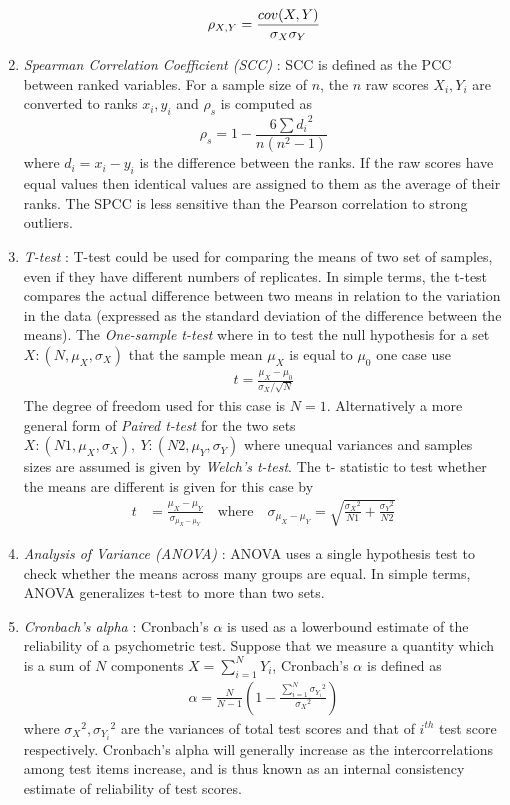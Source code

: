 \begin{enumerate}
\begin{equation}
\rho_{X,Y} = \frac{cov(X,Y)}{\sigma_X\sigma_Y} \\
\end{equation}
\item \emph{Spearman Correlation Coefficient (SCC)} : SCC is defined as the PCC between ranked variables. For a sample size of $n$, the $n$ raw scores $X_i,Y_i$ are converted to ranks $x_i,y_i$ and $\rho_s$ is computed as
\begin{equation}
\rho_s = 1-\frac{6\sum {d_i}^2}{n(n^2-1)} 
\end{equation}
where $d_i=x_i-y_i$ is the difference between the ranks. If the raw scores have equal values then identical values are assigned to them as the average of their ranks. The SPCC is less sensitive than the Pearson correlation to strong outliers. 
\item \emph{T-test} : T-test could be used for comparing the means of two set of samples, even if they have different numbers of replicates. In simple terms, the t-test compares the actual difference between two means in relation to the variation in the data (expressed as the standard deviation of the difference between the means). The \emph{One-sample t-test} where in to test the null hypothesis for a set $X:(N,\mu_X,\sigma_X)$ that the sample mean $\mu_X$ is equal to $\mu_0$ one case use
\begin{align*}
t = \frac{\mu_X - \mu_0}{\sigma_X/\sqrt{N}}
\end{align*}
The degree of freedom used for this case is $N=1$. Alternatively a more general form of \emph{Paired t-test} for the two sets $X:(N1,\mu_X,\sigma_X),\ Y:(N2,\mu_Y,\sigma_Y)$ where unequal variances and samples sizes are assumed is given by \emph{Welch's t-test}. The t- statistic to test whether the means are different is given for this case by
\begin{align*}
t &= \frac{\mu_X-\mu_Y}{\sigma_{\mu_X-\mu_Y}} \quad \text{where} \quad \sigma_{\mu_X-\mu_Y} = \sqrt{\frac{{\sigma_X}^2}{N1}+\frac{{\sigma_Y}^2}{N2}} 
\end{align*}
\item \emph{Analysis of Variance (ANOVA)} : ANOVA uses a single hypothesis test to check whether the means across many groups are equal. In simple terms, ANOVA generalizes t-test to more than two sets.  
\item \emph{Cronbach's alpha} : Cronbach's $\alpha$ is used as a lowerbound estimate of the reliability of a psychometric test. Suppose that we measure a quantity which is a sum of $N$ components $X = \sum_{i=1}^{N} Y_i$, Cronbach's $\alpha$ is defined as 
\begin{align*}
\alpha = \frac{N}{N-1} (1 - \frac{\sum_{i=1}^{N} {\sigma_{Y_i}}^2}{{\sigma_{X}}^2})
\end{align*}
where ${\sigma_X}^2,{\sigma_{Y_i}}^2$ are the variances of total test scores and that of $i^{th}$ test score respectively. Cronbach's alpha will generally increase as the intercorrelations among test items increase, and is thus known as an internal consistency estimate of reliability of test scores.
\end{enumerate}

